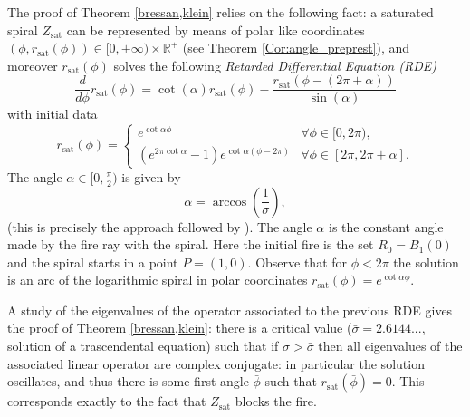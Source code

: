 \documentclass[reqno]{amsart}
\theoremstyle{definition} \newtheorem{definition}{Definition}[section]
\theoremstyle{definition} \newtheorem{remark}[definition]{Remark}
\theoremstyle{plain} \newtheorem{lemma}[definition]{Lemma}
\theoremstyle{plain} \newtheorem{proposition}[definition]{Proposition}
\theoremstyle{plain} \newtheorem{theorem}[definition]{Theorem}
\theoremstyle{plain} \newtheorem{corollary}[definition]{Corollary}
\theoremstyle{definition} \newtheorem{example}[definition]{Example}
\theoremstyle{plain} \newtheorem{claim}[clai]{Claim}
\theoremstyle{definition} \newtheorem{assumption}[definition]{Assumption}
\theoremstyle{definition} \newtheorem{observation}[definition]{Observation}
\newcommand{\R}{\mathbb{R}}
\newcommand{\1}{\mathbbm 1}
\numberwithin{equation}{section} %
\theoremstyle{plain} \newtheorem*{theorem*}{Theorem}
\theoremstyle{plain} \newtheorem{mthm}[maintheorem]{Main Theorem}
\theoremstyle{plain} \newtheorem*{mthm*}{Main Theorem}
\theoremstyle{plain} \newtheorem*{conjecture*}{Conjecture}
\theoremstyle{plain} \newtheorem{conjecture}[definition]{Conjecture}
\theoremstyle{plain} \newtheorem*{problem*}{Problem}
\begin{document}
The proof of Theorem \ref{bressan,klein} relies on the following fact: a saturated spiral $Z_{\text{sat}}$ can be represented by means of polar like coordinates $(\phi,r_{\text{sat}}(\phi)) \in [0,+\infty) \times \R^+$ (see Theorem \ref{Cor:angle_preprest}), and moreover $r_{\text{sat}}(\phi)$ solves the following \emph{Retarded Differential Equation (RDE)} %
\begin{equation}
\label{eq:ODE:saturated:1}
\frac{d}{d\phi} r_{\text{sat}}(\phi) = \cot(\alpha) r_{\text{sat}}(\phi) - \frac{r_{\text{sat}}(\phi - (2\pi+\alpha))}{\sin(\alpha)}
\end{equation}
with initial data
\begin{equation}
\label{Equa:init_satur}
r_{\text{sat}}(\phi) = \begin{cases}
e^{\cot\alpha\phi} & \forall\phi\in[0,2\pi), \\
(e^{2\pi\cot\alpha}-1) e^{\cot\alpha(\phi-2\pi)} & \forall \phi \in [2\pi,2\pi+\alpha].
\end{cases}
\end{equation}
The angle $\alpha \in [0,\frac{\pi}{2})$ is given by
\begin{equation*}%
\alpha = \arccos \left( \frac{1}{\sigma} \right),
\end{equation*}
(this is precisely the approach followed by \cite{firefighter}). The angle $\alpha$ is the constant angle made by the fire ray with the spiral. Here the initial fire is the set $R_0 = B_1(0)$ and the spiral starts in a point $P=(1,0)$. Observe that for $\phi<2\pi$ the solution is an arc of the logarithmic spiral in polar coordinates $r_{\text{sat}}(\phi) = e^{\cot\alpha\phi}$.

A study of the eigenvalues of the operator associated to the previous RDE gives the proof of Theorem \ref{bressan,klein}: there is a critical value ($\bar \sigma = 2.6144...$, solution of a trascendental equation) such that if $\sigma > \bar \sigma$ then all eigenvalues of the associated linear operator are complex conjugate: in particular the solution oscillates, and thus there is some first angle $\bar \phi$ such that $r_{\text{sat}}(\bar \phi) = 0$. This corresponds exactly to the fact that $Z_{\text{sat}}$ blocks the fire.

\end{document}
